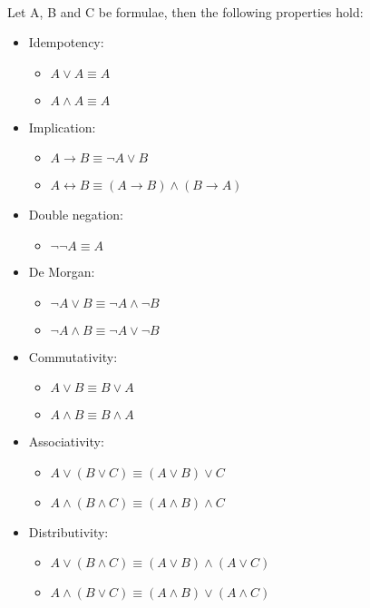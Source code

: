 \documentclass[part1.tex]{subfiles}
\begin{document}
\paragraph{} Let A, B and C be formulae, then the following
properties hold:
\begin{itemize}
\item Idempotency:
  \begin{itemize}
    \item $A \vee A \equiv A$
    \item $A \wedge A \equiv A$
  \end{itemize}
\item Implication:
  \begin{itemize}
   \item $A \rightarrow B \equiv \neg A \vee B$
   \item $A \leftrightarrow B \equiv (A \rightarrow B) \wedge (B
     \rightarrow A)$
  \end{itemize}
\item Double negation:
  \begin{itemize}
    \item $\neg\neg{A} \equiv A$
  \end{itemize}
\item De Morgan:
  \begin{itemize}
    \item $\neg{A \vee B} \equiv \neg{A} \wedge \neg{B}$
    \item $\neg{A \wedge B} \equiv \neg{A} \vee \neg{B}$
  \end{itemize}
\item Commutativity:
  \begin{itemize}
    \item $A \vee B \equiv B \vee A$
    \item $A \wedge B \equiv B \wedge A$
  \end{itemize}
\item Associativity:
  \begin{itemize}
    \item $A \vee (B \vee C) \equiv (A \vee B) \vee C$
    \item $A \wedge (B \wedge C) \equiv (A \wedge B) \wedge C$
  \end{itemize}
\item Distributivity:
  \begin{itemize}
    \item $A \vee (B \wedge C) \equiv (A \vee B) \wedge (A \vee
      C)$
    \item $A \wedge (B \vee C) \equiv (A \wedge B) \vee (A \wedge
      C)$
  \end{itemize}
\end{itemize}
\end{document}
